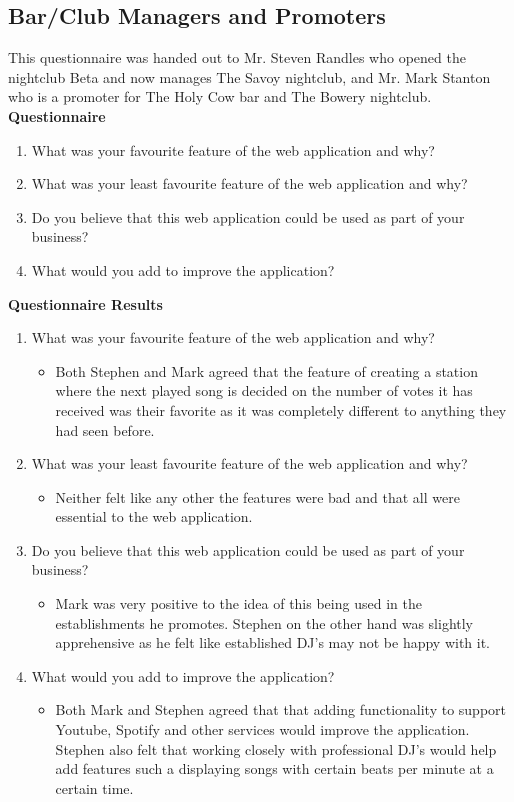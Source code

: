 \documentclass[a4paper, 12pt]{report}
\begin{document}
\subsection{Bar/Club Managers and Promoters}
This questionnaire was handed out to Mr. Steven Randles who opened the nightclub Beta and now manages The Savoy nightclub, and Mr. Mark Stanton who is a promoter for The Holy Cow bar and The Bowery nightclub. 
\textbf{Questionnaire}
\begin{enumerate}
\item What was your favourite feature of the web application and why?
\item What was your least favourite feature of the web application and why?
\item Do you believe that this web application could be used as part of your business?
\item What would you add to improve the application?
\end{enumerate}
\textbf{Questionnaire Results}
\begin{enumerate}
\item What was your favourite feature of the web application and why?
\begin{itemize}
\item Both Stephen and Mark agreed that the feature of creating a station where the next played song is decided on the number of votes it has received was their favorite as it was completely different to anything they had seen before.
\end{itemize}
\item What was your least favourite feature of the web application and why?
\begin{itemize}
\item Neither felt like any other the features were bad and that all were essential to the web application.
\end{itemize}
\item Do you believe that this web application could be used as part of your business?
\begin{itemize}
\item Mark was very positive to the idea of this being used in the establishments he promotes. Stephen on the other hand was slightly apprehensive as he felt like established DJ's may not be happy with it. 
\end{itemize}
\item What would you add to improve the application?
\begin{itemize}
\item Both Mark and Stephen agreed that that adding functionality to support Youtube, Spotify and other services would improve the application. Stephen also felt that working closely with professional DJ's would help add features such a displaying songs with certain beats per minute at a certain time. 
\end{itemize}
\end{enumerate}
\end{document}
